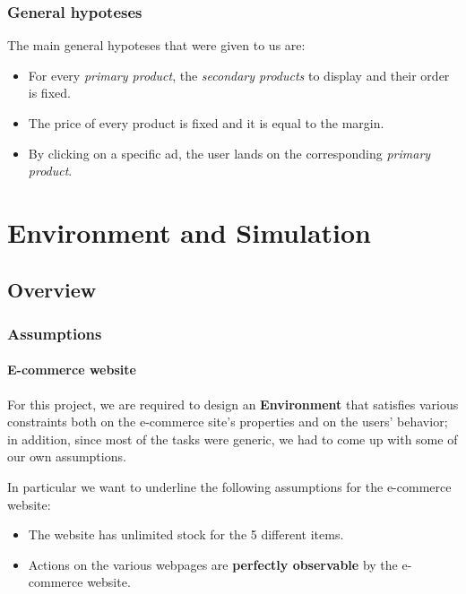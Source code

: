 \documentclass[11pt]{beamer}
\begin{document}

\begin{frame}

\frametitle{General hypoteses}

The main general hypoteses that were given to us are:
\begin{itemize}[label={-}]
    \item For every \textit{primary product}, the \textit{secondary products} to display and their order is fixed.
    \item The price of every product is fixed and it is equal to the margin.
    \item By clicking on a specific ad, the user lands on the corresponding \textit{primary product}.
\end{itemize}

\end{frame}


\section{Environment and Simulation}


\subsection{Overview}


\begin{frame}

\frametitle{Assumptions}
\framesubtitle{E-commerce website}

For this project, we are required to design an \textbf{Environment} that satisfies various constraints both on the e-commerce site's properties and on the users' behavior; in addition, since most of the tasks were generic, we had to come up with some of our own assumptions.

In particular we want to underline the following assumptions for the e-commerce website:
\begin{itemize}[label={-}]
    \item The website has unlimited stock for the 5 different items.
    \item Actions on the various webpages are \textbf{perfectly observable} by the e-commerce website.
\end{itemize}

\end{frame}
\end{document}
